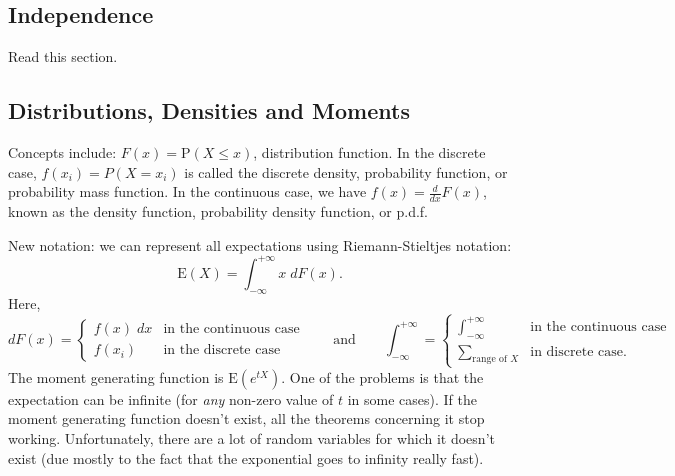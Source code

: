 \documentclass[english,12pt]{article}
\theoremstyle{plain}
\theoremstyle{definition}
\theoremstyle{definition} %
\begin{document}
\subsection{Independence}

Read this section.

\subsection{Distributions, Densities and Moments}

Concepts include: $F(x) = \text{P}(X \leq x)$, distribution function. In the discrete case, $f(x_i) = P(X=x_i)$ is called the discrete density, probability function, or probability mass function. In the continuous case, we have $f(x) = \frac{d}{dx} F(x)$, known as the density function, probability density function, or p.d.f.

New notation: we can represent all expectations using Riemann-Stieltjes notation:
\[ \text{E}(X) = \int_{-\infty}^{+\infty} x \; dF(x). \]
Here,
\[ dF(x) = \begin{cases}
f(x) \; dx & \text{in the continuous case} \\
f(x_i) & \text{in the discrete case}
\end{cases} \qquad \text{and} \qquad \int_{-\infty}^{+\infty} = \begin{cases} \displaystyle \int_{-\infty}^{+\infty} & \text{in the continuous case} \\
\displaystyle \sum_{\text{range of $X$}} & \text{in discrete case.} \end{cases} \]
The moment generating function is $\text{E}(e^{tX})$. One of the problems is that the expectation can be infinite (for \emph{any} non-zero value of $t$ in some cases). If the moment generating function doesn't exist, all the theorems concerning it stop working. Unfortunately, there are a lot of random variables for which it doesn't exist (due mostly to the fact that the exponential goes to infinity really fast).
\end{document}

